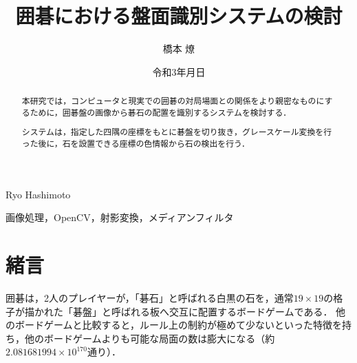 \documentclass[openright]{nitocs}
\numberwithin{equation}{section}
\begin{document}
    \title{囲碁における盤面識別システムの検討}  %
    \author{橋本 燎}{Ryo Hashimoto} %
    \date{令和3年\number\month 月\number\day 日} %

    \begin{abstract} %
        本研究では，コンピュータと現実での囲碁の対局場面との関係をより親密なものにするために，囲碁盤の画像から碁石の配置を識別するシステムを検討する．

        システムは，指定した四隅の座標をもとに碁盤を切り抜き，グレースケール変換を行った後に，石を設置できる座標の色情報から石の検出を行う．
    \end{abstract}

    \begin{keyword} %
        画像処理，OpenCV，射影変換，メディアンフィルタ
    \end{keyword}


    \maketitle

    \section{緒言}  
    \label{sec:format}
        囲碁は，2人のプレイヤーが，「碁石」と呼ばれる白黒の石を，通常$19\times19$の格子が描かれた「碁盤」と呼ばれる板へ交互に配置するボードゲームである．
        他のボードゲームと比較すると，ルール上の制約が極めて少ないといった特徴を持ち，他のボードゲームよりも可能な局面の数は膨大になる（約$2.081681994 \times 10^{170}$通り\cite{numbers}）．
\end{document}
